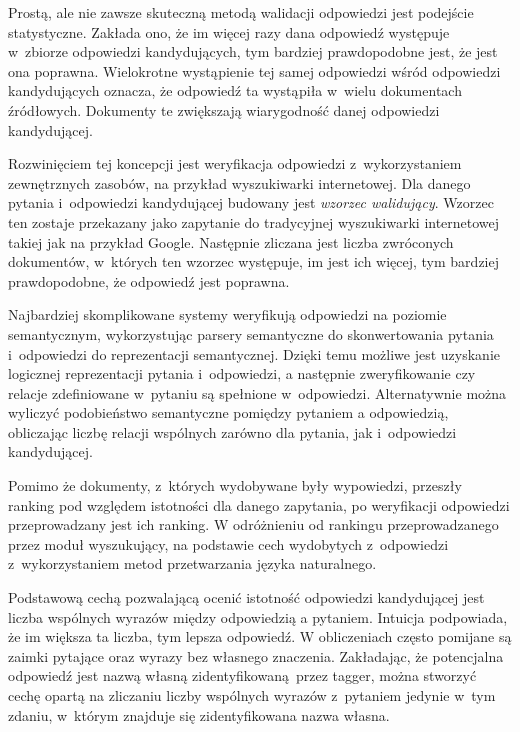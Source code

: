 \documentclass[a4paper, twoside, 12pt]{report}
\begin{document}
            Prostą, ale nie zawsze skuteczną metodą walidacji odpowiedzi jest podejście statystyczne. Zakłada ono, że
            im więcej razy dana odpowiedź występuje w~zbiorze odpowiedzi kandydujących, tym bardziej prawdopodobne
            jest, że jest ona poprawna. Wielokrotne wystąpienie tej samej odpowiedzi wśród odpowiedzi kandydujących
            oznacza, że odpowiedź ta wystąpiła w~wielu dokumentach źródłowych. Dokumenty te zwiększają wiarygodność
            danej odpowiedzi kandydującej.

            Rozwinięciem tej koncepcji jest weryfikacja odpowiedzi z~wykorzystaniem zewnętrznych zasobów, na przykład
            wyszukiwarki internetowej. Dla danego
            pytania i~odpowiedzi kandydującej budowany jest \emph{wzorzec walidujący}. Wzorzec ten zostaje przekazany
            jako zapytanie do tradycyjnej wyszukiwarki internetowej takiej jak na przykład Google. Następnie zliczana
            jest liczba zwróconych dokumentów, w~których ten wzorzec występuje, im jest ich więcej, tym bardziej
            prawdopodobne, że odpowiedź jest poprawna\cite{WEBVERIFICATION}.

            Najbardziej skomplikowane systemy weryfikują odpowiedzi na poziomie semantycznym, wykorzystując parsery
            semantyczne do skonwertowania pytania i~odpowiedzi do reprezentacji semantycznej. Dzięki temu możliwe
            jest uzyskanie logicznej reprezentacji pytania i~odpowiedzi, a następnie zweryfikowanie czy relacje
            zdefiniowane w~pytaniu są spełnione w~odpowiedzi. Alternatywnie można wyliczyć podobieństwo semantyczne
            pomiędzy pytaniem a odpowiedzią, obliczając liczbę relacji wspólnych zarówno dla pytania, jak i~odpowiedzi
            kandydującej\cite{SEMANTICVERIFICATION}.

            Pomimo że dokumenty, z~których wydobywane były wypowiedzi, przeszły ranking pod względem istotności dla danego
            zapytania, po weryfikacji odpowiedzi przeprowadzany jest ich ranking. W odróżnieniu od rankingu przeprowadzanego
            przez moduł wyszukujący, na podstawie cech wydobytych z~odpowiedzi z~wykorzystaniem metod przetwarzania
            języka naturalnego.

            Podstawową cechą pozwalającą ocenić istotność odpowiedzi kandydującej jest liczba wspólnych wyrazów między
            odpowiedzią a pytaniem. Intuicja podpowiada, że im większa ta liczba, tym lepsza odpowiedź. W obliczeniach
            często pomijane są zaimki pytające oraz wyrazy bez własnego znaczenia. Zakładając, że potencjalna odpowiedź
            jest nazwą własną zidentyfikowaną przez tagger, można stworzyć cechę opartą na zliczaniu liczby wspólnych
            wyrazów z~pytaniem jedynie w~tym zdaniu, w~którym znajduje się zidentyfikowana nazwa własna.
\end{document}
